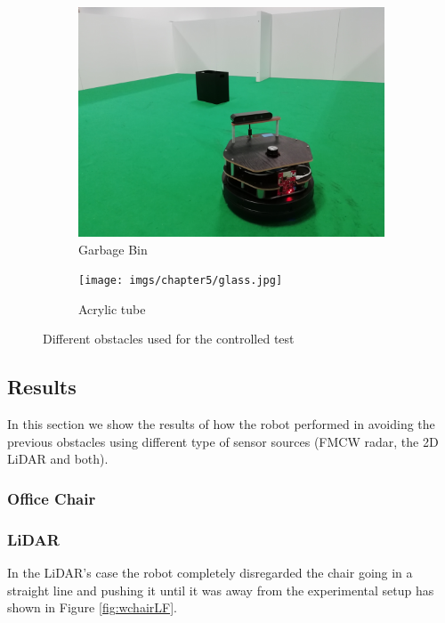 \begin{figure}[h!]
\begin{subfigure}[b]{0.3\linewidth}
    \includegraphics[width=\linewidth]{imgs/chapter5/garbage.jpg}
    \caption{Garbage Bin}
    \label{fig::garbage}
  \end{subfigure}
  \begin{subfigure}[b]{0.3\linewidth}
    \texttt{[image: imgs/chapter5/glass.jpg]}
    \caption{Acrylic tube}
    \label{fig::garbage}
  \end{subfigure}
  \caption{Different obstacles used for the controlled test}
  \label{fig:obstacles}
\end{figure}

\subsection{Results}
In this section we show the results of how the robot performed in avoiding the previous obstacles using different type of sensor sources (\ac{FMCW} radar, the 2D \ac{LiDAR} and both).

\subsubsection{Office Chair}







\subsubsection*{\ac{LiDAR}}
In the \ac{LiDAR}'s case  the robot completely disregarded the chair going in a straight line and pushing it until it was away from the experimental setup has shown in Figure \ref{fig:wchairLF}.

